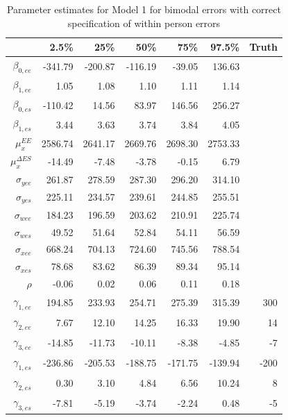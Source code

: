 \documentclass[11pt]{article}\usepackage[]{graphicx}\usepackage[]{color}
\begin{document}
\begin{table}[ht]
\centering
\begin{tabular}{rrrrrr|r}
  \hline
 & 2.5\% & 25\% & 50\% & 75\% & 97.5\% & Truth\\
  \hline
$\beta_{0,ee}$ & -341.79 & -200.87 & -116.19 & -39.05 & 136.63 \\ 
  $\beta_{1,ee}$ & 1.05 & 1.08 & 1.10 & 1.11 & 1.14 \\ 
  $\beta_{0,es}$ & -110.42 & 14.56 & 83.97 & 146.56 & 256.27 \\ 
  $\beta_{1,es}$ & 3.44 & 3.63 & 3.74 & 3.84 & 4.05 \\ 
  $\mu_x^{EE}$ & 2586.74 & 2641.17 & 2669.76 & 2698.30 & 2753.33 \\ 
  $\mu_x^{\Delta ES}$ & -14.49 & -7.48 & -3.78 & -0.15 & 6.79 \\ 
  $\sigma_{yee}$ & 261.87 & 278.59 & 287.30 & 296.20 & 314.10 \\ 
  $\sigma_{yes}$ & 225.11 & 234.57 & 239.61 & 244.85 & 255.51 \\ 
  $\sigma_{wee}$ & 184.23 & 196.59 & 203.62 & 210.91 & 225.74 \\ 
  $\sigma_{wes}$ & 49.52 & 51.64 & 52.84 & 54.11 & 56.59 \\ 
  $\sigma_{xee}$ & 668.24 & 704.13 & 724.60 & 745.56 & 788.54 \\ 
  $\sigma_{xes}$ & 78.68 & 83.62 & 86.39 & 89.34 & 95.14 \\ 
  $\rho$ & -0.06 & 0.02 & 0.06 & 0.11 & 0.18 \\ 
  $\gamma_{1,ee}$ & 194.85 & 233.93 & 254.71 & 275.39 & 315.39 & 300\\ 
  $\gamma_{2,ee}$ & 7.67 & 12.10 & 14.25 & 16.33 & 19.90 & 14\\ 
  $\gamma_{3,ee}$ & -14.85 & -11.73 & -10.11 & -8.38 & -4.85 & -7\\ 
  $\gamma_{1,es}$ & -236.86 & -205.53 & -188.75 & -171.75 & -139.94 & -200 \\ 
  $\gamma_{2,es}$ & 0.30 & 3.10 & 4.84 & 6.56 & 10.24 & 8\\ 
  $\gamma_{3,es}$ & -7.81 & -5.19 & -3.74 & -2.24 & 0.48 & -5\\ 
  \hline
\end{tabular}
\caption{Parameter estimates for Model 1 for bimodal errors with correct specification of within person errors}
\label{m1bwpestimates}
\end{table}
\end{document}
